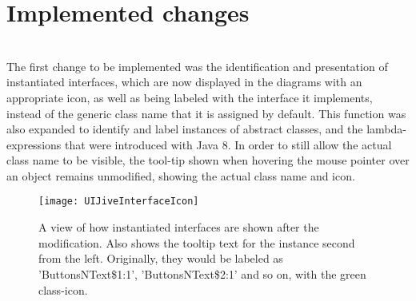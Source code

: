 \section{Implemented changes}\label{jiveImpl}%
~\\

The first change to be implemented was the identification and presentation of instantiated interfaces, which are now displayed in the diagrams with an appropriate icon, as well as being labeled with the interface it implements, instead of the generic class name that it is assigned by default.
This function was also expanded to identify and label instances of abstract classes, and the lambda-expressions that were introduced with Java 8.%
In order to still allow the actual class name to be visible, the tool-tip shown when hovering the mouse pointer over an object remains unmodified, showing the actual class name and icon.
\begin{figure}[H]
	\centering
	\texttt{[image: UIJiveInterfaceIcon]}
	\caption{A view of how instantiated interfaces are shown after the modification. Also shows the tooltip text for the instance second from the left. Originally, they would be labeled as 'ButtonsNText\$1:1', 'ButtonsNText\$2:1' and so on, with the green class-icon.}
	\label{fig:JiveNewIcon}
\end{figure}
~\\

